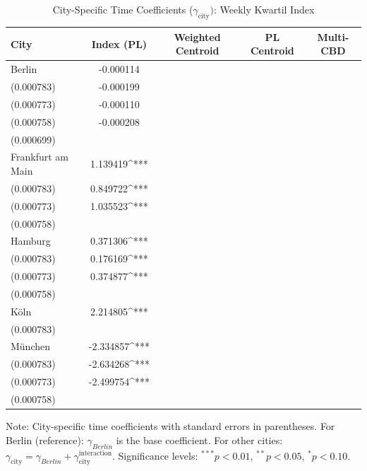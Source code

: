 \documentclass{article}
\begin{document}
\begin{table}[h!]
\centering
\caption{City-Specific Time Coefficients ($\gamma_{\text{city}})$: Weekly Kwartil Index}
\label{tab:city_gammas_index_wk}
\begin{tabular}{lcccc}
\toprule
City & Index (PL) & Weighted Centroid & PL Centroid & Multi-CBD \\
\midrule
Berlin & -0.000114 \\ (0.000783) & -0.000199 \\ (0.000773) & -0.000110 \\ (0.000758) & -0.000208 \\ (0.000699) \\
Frankfurt am Main & 1.139419^{***} \\ (0.000783) & 0.849722^{***} \\ (0.000773) & 1.035523^{***} \\ (0.000758) &  \\
Hamburg & 0.371306^{***} \\ (0.000783) & 0.176169^{***} \\ (0.000773) & 0.374877^{***} \\ (0.000758) &  \\
Köln & 2.214805^{***} \\ (0.000783) &  &  &  \\
München & -2.334857^{***} \\ (0.000783) & -2.634268^{***} \\ (0.000773) & -2.499754^{***} \\ (0.000758) &  \\
\bottomrule
\end{tabular}
\begin{tablenotes}[para]
\small
Note: City-specific time coefficients with standard errors in parentheses.
For Berlin (reference): $\gamma_{Berlin}$ is the base coefficient.
For other cities: $\gamma_{\text{city}} = \gamma_{Berlin} + \gamma_{\text{city}}^{\text{interaction}}$.
Significance levels: $^{***} p<0.01$, $^{**} p<0.05$, $^{*} p<0.10$.
\end{tablenotes}
\end{table}
\end{document}
